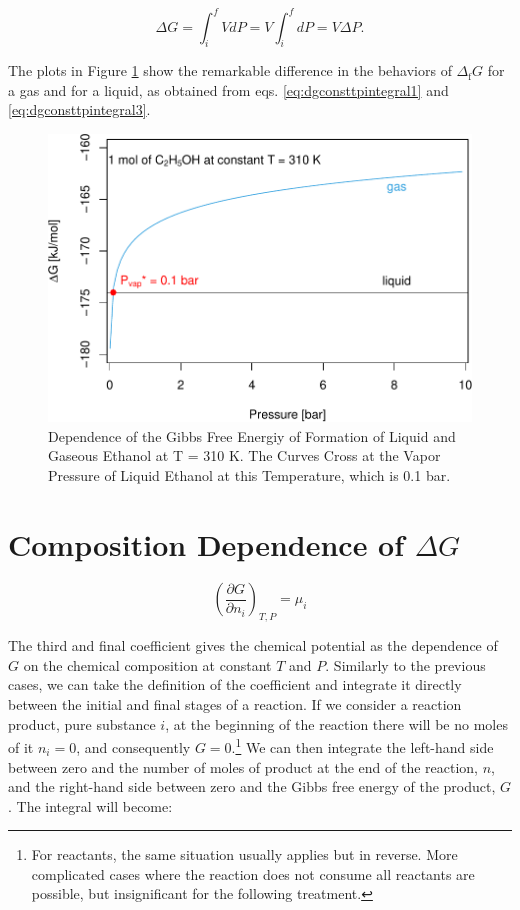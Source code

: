 \documentclass[
  9pt,
]{extbook}
\theoremstyle{definition}
\theoremstyle{definition}
\theoremstyle{definition}
\theoremstyle{remark}
\begin{document}
\begin{equation}
\Delta G = \int_i^f VdP = V \int_i^f dP = V \Delta P.
\label{eq:dgconsttpintegral3}
\end{equation}

The plots in Figure \ref{fig:gdeppfig} show the remarkable difference in the behaviors of \(\Delta_{\text{f}} G\) for a gas and for a liquid, as obtained from eqs. \eqref{eq:dgconsttpintegral1} and \eqref{eq:dgconsttpintegral3}.

\begin{figure}

{\centering \includegraphics{pchem1_files/figure-latex/gdeppfig-1} 

}

\caption{Dependence of the Gibbs Free Energiy of Formation of Liquid and Gaseous Ethanol at T = 310 K. The Curves Cross at the Vapor Pressure of Liquid Ethanol at this Temperature, which is 0.1 bar.}\label{fig:gdeppfig}
\end{figure}

\hypertarget{composition-dependence-of-delta-g}{%
\section{\texorpdfstring{Composition Dependence of \(\Delta G\)}{Composition Dependence of \textbackslash Delta G}}\label{composition-dependence-of-delta-g}}

\[
\left(\frac{\partial G}{\partial n_i} \right)_{T,P}=\mu_i
\]

The third and final coefficient gives the chemical potential as the dependence of \(G\) on the chemical composition at constant \(T\) and \(P\). Similarly to the previous cases, we can take the definition of the coefficient and integrate it directly between the initial and final stages of a reaction. If we consider a reaction product, pure substance \(i\), at the beginning of the reaction there will be no moles of it \(n_i=0\), and consequently \(G=0\).\footnote{For reactants, the same situation usually applies but in reverse. More complicated cases where the reaction does not consume all reactants are possible, but insignificant for the following treatment.} We can then integrate the left-hand side between zero and the number of moles of product at the end of the reaction, \(n\), and the right-hand side between zero and the Gibbs free energy of the product, \(G\). The integral will become:
\end{document}
